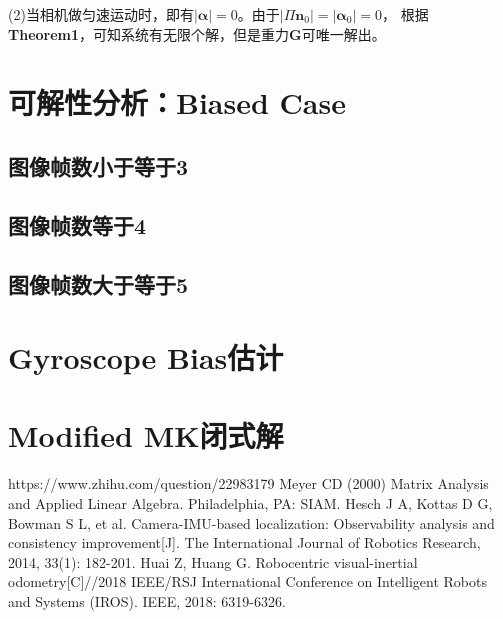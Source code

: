 \documentclass{article}
\begin{document}
\par
(2)当相机做匀速运动时，即有$|\mathbf{\alpha}|=0$。由于$|\Pi\textbf{n}_0|=|\mathbf{\alpha}_0|=0$，
根据\textbf{Theorem1}，可知系统有无限个解，但是重力$\textbf{G}$可唯一解出。

\section{可解性分析：Biased Case}



\subsection{图像帧数小于等于3}

\subsection{图像帧数等于4}

\subsection{图像帧数大于等于5}

\section{Gyroscope Bias估计}

\section{Modified MK闭式解}


\begin{thebibliography}{99}  
    https://www.zhihu.com/question/22983179
    Meyer CD (2000) Matrix Analysis and Applied Linear Algebra. Philadelphia, PA: SIAM.
     Hesch J A, Kottas D G, Bowman S L, et al. Camera-IMU-based localization: Observability analysis and consistency improvement[J]. The International Journal of Robotics Research, 2014, 33(1): 182-201.
     Huai Z, Huang G. Robocentric visual-inertial odometry[C]//2018 IEEE/RSJ International Conference on Intelligent Robots and Systems (IROS). IEEE, 2018: 6319-6326.
\end{thebibliography}
\end{document}
